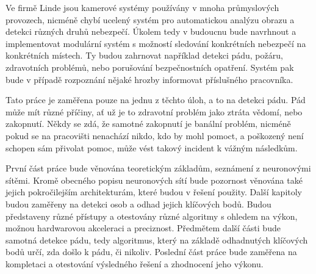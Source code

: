 Ve firmě Linde jsou kamerové systémy používány v mnoha průmyslových provozech,
nicméně chybí ucelený systém pro automatickou analýzu obrazu a detekci různých
druhů nebezpečí. Úkolem tedy v budoucnu bude navrhnout a implementovat
modulární systém s možností sledování konkrétních nebezpečí na konkrétních
místech. Ty budou zahrnovat například detekci pádu, požáru, zdravotních
problémů, nebo porušování bezpečnostních opatření. Systém pak bude v případě
rozpoznání nějaké hrozby informovat příslušného pracovníka.

Tato práce je zaměřena pouze na jednu z těchto úloh, a to na detekci pádu. Pád
může mít různé příčiny, ať už je to zdravotní problém jako ztráta vědomí, nebo
zakopnutí. Někdy se zdá, že samotné zakopnutí je banální problém, nicméně pokud
se na pracovišti nenachází nikdo, kdo by mohl pomoct, a poškozený není schopen
sám přivolat pomoc, může vést takový incident k vážným následkům.

První část práce bude věnována teoretickým základům, seznámení z neuronovými
sítěmi. Kromě obecného popisu neuronových sítí bude pozornost věnována také jejich pokročilejším architekturám, které budou v řešení použity. Další kapitoly budou zaměřeny na detekci osob a odhad jejich klíčových bodů. Budou představeny různé
přístupy a otestovány různé algoritmy s ohledem na výkon, možnou hardwarovou
akceleraci a preciznost. Předmětem další části bude samotná detekce pádu, tedy
algoritmus, který na základě odhadnutých klíčových bodů určí, zda došlo k pádu,
či nikoliv. Poslední část práce bude zaměřena na kompletaci a otestování výsledného
řešení a zhodnocení jeho výkonu.

\endinput